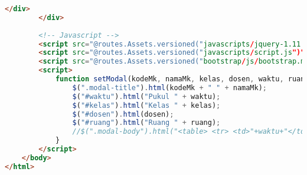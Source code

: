 \begin{lstlisting}[language=html,basicstyle=\tiny,caption=jadwalKuliah.scala.html]
			</div>
		</div>
		
		<!-- Javascript -->
		<script src="@routes.Assets.versioned("javascripts/jquery-1.11.3.min.js")"></script>
		<script src="@routes.Assets.versioned("javascripts/script.js")"></script>
		<script src="@routes.Assets.versioned("bootstrap/js/bootstrap.min.js")"></script>
		<script>
			function setModal(kodeMk, namaMk, kelas, dosen, waktu, ruang) {
				$(".modal-title").html(kodeMk + " " + namaMk);
				$("#waktu").html("Pukul " + waktu);
				$("#kelas").html("Kelas " + kelas);
				$("#dosen").html(dosen);
				$("#ruang").html("Ruang " + ruang);
				//$(".modal-body").html("<table> <tr> <td>"+waktu+"</td></tr><tr><td>Kelas "+kelas+"</td></tr><tr><td>"+dosen+"</td></tr><tr><td>"+ruang+"</td></tr></table>");
			}
		</script>
    </body>
</html>
\end{lstlisting}

